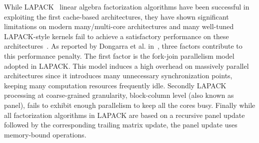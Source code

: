 While LAPACK~\cite{anderson1999lapack} linear algebra factorization
algorithms have been successful in exploiting the first cache-based
architectures, they have shown significant limitations on modern
many/multi-core architectures and many well-tuned LAPACK-style kernels
fail to achieve a satisfactory performance on these
architectures~\cite{agullo2009comparative}. As reported by Dongarra et
al. in~\cite{dongarra2011achieving}, three factors contribute to this
performance penalty. The first factor is the fork-join parallelism
model adopted in LAPACK. This model induces a high overhead on
massively parallel architectures since it introduces many unnecessary
synchronization points, keeping many computation resources frequently
idle. Secondly LAPACK processing at coarse-grained granularity,
block-column level (also known as panel), fails to exhibit
enough parallelism to keep all the cores busy. Finally
while all factorization algorithms in LAPACK are based on
a recursive panel update followed by the corresponding trailing
matrix update, the panel update uses memory-bound operations.


